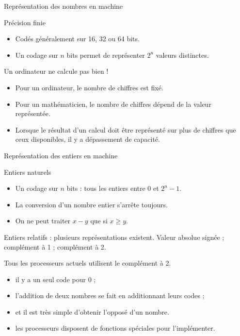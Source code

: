 \begin{frame}{Représentation des nombres en machine}

  \begin{block}{Précision finie}
    \begin{itemize}
    \item Codés généralement sur 16, 32 ou 64 bits.
    \item Un codage sur $n$ bits permet de représenter $2^n$ valeurs distinctes.
    \end{itemize}
  \end{block}
  
  \begin{alertblock}{Un ordinateur ne calcule pas bien !}
  \begin{itemize}
   \item Pour un ordinateur, le nombre de chiffres est fixé.
   \item Pour un mathématicien, le nombre de chiffres dépend de la valeur représentée.
   \item Lorsque le résultat d’un calcul doit être représenté sur plus de chiffres que ceux disponibles, il y a dépassement de capacité.
  \end{itemize}
\end{alertblock}

\end{frame}


\begin{frame}{Représentation des entiers en machine}
  \begin{block}{Entiers naturels}
    \begin{itemize}
    \item Un codage sur $n$ bits : tous les entiers entre 0 et $2^n-1$.
    \item La conversion d’un nombre entier s’arrête toujours.
    \item On ne peut traiter $x - y$ que si $x \geq y$. 
    \end{itemize}
  \end{block}

  \begin{block}{Entiers relatifs : plusieurs représentations existent.}
    Valeur absolue signée ; complément à 1 ; complément à 2.
  \end{block}

  \begin{block}{Tous les processeurs actuels utilisent le complément à 2.}
    \begin{itemize}
    \item il y a un seul code pour 0 ;
    \item l'addition de deux nombres se fait en additionnant leurs codes ;
    \item et il est très simple d'obtenir l'opposé d'un nombre.
    \item les processeurs disposent de fonctions spéciales pour l'implémenter.
    \end{itemize}

  \end{block}
\end{frame}




